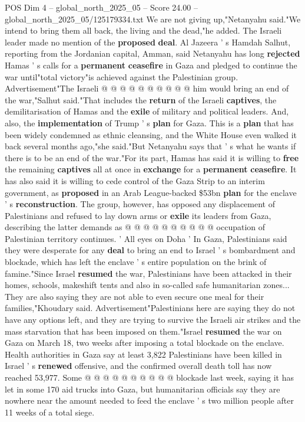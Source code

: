 \begin{textsample}{POS Dim 4 – global\_north\_2025\_05 – Score 24.00 – global\_north\_2025\_05/125179334.txt}
We are not giving up,"Netanyahu said."We intend to bring them all back, the living and the dead,"he added.
The Israeli leader made no mention of the \textbf{proposed} \textbf{deal}.
Al Jazeera ' s Hamdah Salhut, reporting from the Jordanian capital, Amman, said Netanyahu has long \textbf{rejected} Hamas ' s calls for a \textbf{permanent} \textbf{ceasefire} in Gaza and pledged to continue the war until"total victory"is achieved against the Palestinian group.
Advertisement"The Israeli @ @ @ @ @ @ @ @ @ @ him would bring an end of the war,"Salhut said."That includes the \textbf{return} of the Israeli \textbf{captives}, the demilitarisation of Hamas and the \textbf{exile} of military and political leaders.
And, also, the \textbf{implementation} of Trump ' s \textbf{plan} for Gaza.
This is a \textbf{plan} that has been widely condemned as ethnic cleansing, and the White House even walked it back several months ago,"she said."But Netanyahu says that ' s what he wants if there is to be an end of the war."For its part, Hamas has said it is willing to \textbf{free} the remaining \textbf{captives} all at once in \textbf{exchange} for a \textbf{permanent} \textbf{ceasefire}.
It has also said it is willing to cede control of the Gaza Strip to an interim government, as \textbf{proposed} in an Arab League-backed \$53bn \textbf{plan} for the enclave ' s \textbf{reconstruction}.
The group, however, has opposed any displacement of Palestinians and refused to lay down arms or \textbf{exile} its leaders from Gaza, describing the latter demands as @ @ @ @ @ @ @ @ @ @ occupation of Palestinian territory continues. ' All eyes on Doha ' In Gaza, Palestinians said they were desperate for any \textbf{deal} to bring an end to Israel ' s bombardment and blockade, which has left the enclave ' s entire population on the brink of famine."Since Israel \textbf{resumed} the war, Palestinians have been attacked in their homes, schools, makeshift tents and also in so-called safe humanitarian zones...
They are also saying they are not able to even secure one meal for their families,"Khoudary said.
Advertisement"Palestinians here are saying they do not have any options left, and they are trying to survive the Israeli air strikes and the mass starvation that has been imposed on them."Israel \textbf{resumed} the war on Gaza on March 18, two weeks after imposing a total blockade on the enclave.
Health authorities in Gaza say at least 3,822 Palestinians have been killed in Israel ' s \textbf{renewed} offensive, and the confirmed overall death toll has now reached 53,977.
Some @ @ @ @ @ @ @ @ @ @ blockade last week, saying it has let in some 170 aid trucks into Gaza, but humanitarian officials say they are nowhere near the amount needed to feed the enclave ' s two million people after 11 weeks of a total siege.

\end{textsample}
